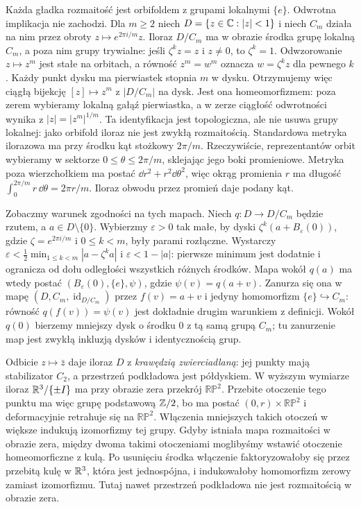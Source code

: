 \begin{przyklad}
\label{prz:klein-orbifoldy}
Każda gładka rozmaitość jest orbifoldem z grupami lokalnymi
$\{e\}$. Odwrotna implikacja nie zachodzi. Dla $m\geq2$ niech
$D=\{z\in\mathbb{C}:|z|<1\}$ i niech $C_m$ działa na nim przez obroty
$z\mapsto e^{2\pi i/m}z$. Iloraz $D/C_m$ ma w obrazie środka
grupę lokalną $C_m$, a poza nim grupy trywialne:
jeśli $\zeta^kz=z$ i $z\ne0$, to $\zeta^k=1$.
Odwzorowanie $z\mapsto z^m$ jest stałe na orbitach,
a równość $z^m=w^m$ oznacza $w=\zeta^kz$ dla pewnego $k$.
Każdy punkt dysku ma pierwiastek stopnia $m$ w dysku.
Otrzymujemy więc ciągłą bijekcję
$[z]\mapsto z^m$ z $|D/C_m|$ na dysk.
Jest ona homeomorfizmem: poza zerem wybieramy lokalną
gałąź pierwiastka, a w zerze ciągłość odwrotności
wynika z $|z|=|z^m|^{1/m}$.
Ta identyfikacja jest topologiczna,
ale nie usuwa grupy lokalnej: jako orbifold iloraz nie jest zwykłą
rozmaitością. Standardowa metryka ilorazowa ma przy środku kąt
stożkowy $2\pi/m$. Rzeczywiście, reprezentantów orbit
wybieramy w sektorze $0\leq\theta\leq2\pi/m$, sklejając
jego boki promieniowe. Metryka poza wierzchołkiem ma postać
$\dd r^2+r^2\dd\theta^2$, więc okrąg promienia $r$ ma długość
$\int_0^{2\pi/m}r\,\dd\theta=2\pi r/m$.
Iloraz obwodu przez promień daje podany kąt.

Zobaczmy warunek zgodności na tych mapach. Niech
$q:D\to D/C_m$ będzie rzutem, a $a\in D\setminus\{0\}$.
Wybierzmy $\varepsilon>0$ tak małe, by dyski
$\zeta^k(a+B_\varepsilon(0))$, gdzie
$\zeta=e^{2\pi i/m}$ i $0\leq k<m$, były parami rozłączne.
Wystarczy
$\varepsilon<\frac12\min_{1\leq k<m}|a-\zeta^ka|$
i $\varepsilon<1-|a|$: pierwsze minimum jest dodatnie
i ogranicza od dołu odległości wszystkich różnych środków.
Mapa wokół $q(a)$ ma wtedy postać
$(B_\varepsilon(0),\{e\},\psi)$, gdzie
$\psi(v)=q(a+v)$. Zanurza się ona w mapę
$(D,C_m,\operatorname{id}_{D/C_m})$ przez $f(v)=a+v$
i jedyny homomorfizm $\{e\}\hookrightarrow C_m$:
równość $q(f(v))=\psi(v)$ jest dokładnie drugim
warunkiem z definicji.
Wokół $q(0)$ bierzemy mniejszy dysk o środku $0$ z tą
samą grupą $C_m$; tu zanurzenie map jest zwykłą
inkluzją dysków i identycznością grup.

Odbicie $z\mapsto\bar z$ daje iloraz $D$ z \emph{krawędzią
zwierciadlaną}: jej punkty mają stabilizator $C_2$, a przestrzeń
podkładowa jest półdyskiem. W wyższym wymiarze iloraz
$\mathbb{R}^3/\{\pm I\}$ ma przy obrazie zera przekrój $\mathbb{RP}^2$.
Przebite otoczenie tego punktu ma więc grupę podstawową $\mathbb{Z}/2$,
bo ma postać $(0,r)\times\mathbb{RP}^2$ i deformacyjnie
retrahuje się na $\mathbb{RP}^2$.
Włączenia mniejszych takich otoczeń w większe indukują
izomorfizmy tej grupy. Gdyby istniała mapa rozmaitości
w obrazie zera, między dwoma takimi otoczeniami moglibyśmy
wstawić otoczenie homeomorficzne z kulą.
Po usunięciu środka włączenie faktoryzowałoby się przez
przebitą kulę w $\mathbb{R}^3$, która jest jednospójna,
i indukowałoby homomorfizm zerowy zamiast izomorfizmu.
Tutaj nawet
przestrzeń podkładowa nie jest rozmaitością w obrazie zera.
\end{przyklad}

